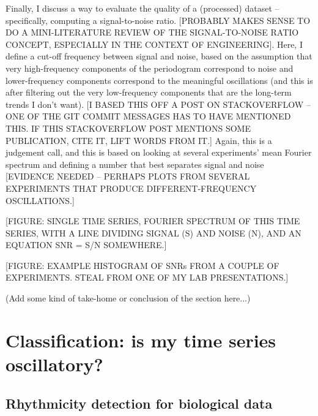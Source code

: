 Finally, I discuss a way to evaluate the quality of a (processed) dataset -- specifically, computing a signal-to-noise ratio.
[PROBABLY MAKES SENSE TO DO A MINI-LITERATURE REVIEW OF THE SIGNAL-TO-NOISE RATIO CONCEPT, ESPECIALLY IN THE CONTEXT OF ENGINEERING].
Here, I define a cut-off frequency between signal and noise, based on the assumption that very high-frequency components of the periodogram correspond to noise and lower-frequency components correspond to the meaningful oscillations (and this is after filtering out the very low-frequency components that are the long-term trends I don't want).
[I BASED THIS OFF A POST ON STACKOVERFLOW -- ONE OF THE GIT COMMIT MESSAGES HAS TO HAVE MENTIONED THIS.  IF THIS STACKOVERFLOW POST MENTIONS SOME PUBLICATION, CITE IT, LIFT WORDS FROM IT.]
Again, this is a judgement call, and this is based on looking at several experiments' mean Fourier spectrum and defining a number that best separates signal and noise [EVIDENCE NEEDED -- PERHAPS PLOTS FROM SEVERAL EXPERIMENTS THAT PRODUCE DIFFERENT-FREQUENCY OSCILLATIONS.]

[FIGURE: SINGLE TIME SERIES, FOURIER SPECTRUM OF THIS TIME SERIES, WITH A LINE DIVIDING SIGNAL (S) AND NOISE (N), AND AN EQUATION SNR = S/N SOMEWHERE.]

[FIGURE: EXAMPLE HISTOGRAM OF SNRs FROM A COUPLE OF EXPERIMENTS.  STEAL FROM ONE OF MY LAB PRESENTATIONS.]

(Add some kind of take-home or conclusion of the section here...)

\section{Classification: is my time series oscillatory?}
\label{sec:analysis-classification}

\subsection{Rhythmicity detection for biological data}
\label{subsec:analysis-classification-rhythmicity}


